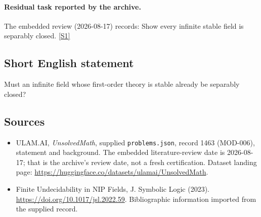 \documentclass[11pt,a4paper]{article}
\newcommand{\sref}[2]{\hyperlink{source:#1:#2}{[S#2]}}
\begin{document}
\paragraph{Residual task reported by the archive.}

The embedded review (2026-08-17) records: Show every infinite stable field is separably closed. \sref{1463}{1}

\subsection{Short English statement}

Must an infinite field whose first-order theory is stable already be separably closed?

\subsection{Sources}

{\small

\begin{itemize}

\item[\hypertarget{source:1463:1}{S1}] ULAM.AI, \emph{UnsolvedMath}, supplied \texttt{problems.json}, record 1463 (MOD-006), statement and background. The embedded literature-review date is 2026-08-17; that is the archive’s review date, not a fresh certification. Dataset landing page: \url{https://huggingface.co/datasets/ulamai/UnsolvedMath}.

\item[\hypertarget{source:1463:2}{S2}] Finite Undecidability in NIP Fields, J. Symbolic Logic (2023). \url{https://doi.org/10.1017/jsl.2022.59}. Bibliographic information imported from the supplied record.

\end{itemize}

}

\label{end:1463}
\end{document}
